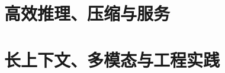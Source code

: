 \documentclass[UTF8,12pt,a4paper,fontset=fandol]{ctexbook}
\begin{document}



\part{高效推理、压缩与服务}





\part{长上下文、多模态与工程实践}





\appendix
\end{document}
